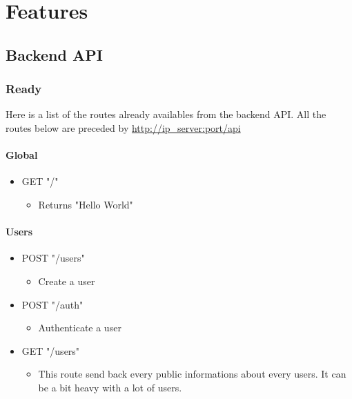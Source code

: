 \part{Features}

\chapter{Backend API}

\section{Ready}

Here is a list of the routes already availables from the backend API. All the routes below are preceded by \url{http://ip_server:port/api}

\subsection{Global}
\begin{itemize}
	\item GET "/"
	\begin{itemize}
		\item Returns "Hello World"
	\end{itemize}
\end{itemize}

\subsection{Users}
\begin{itemize}
	\item POST "/users"
	\begin{itemize}
		\item Create a user
	\end{itemize}
\end{itemize}

\begin{itemize}
	\item POST "/auth"
	\begin{itemize}
		\item Authenticate a user
	\end{itemize}
\end{itemize}

\begin{itemize}
	\item GET "/users"
	\begin{itemize}
		\item This route send back every public informations about every users. It can be a bit heavy with a lot of users.
	\end{itemize}
\end{itemize}

